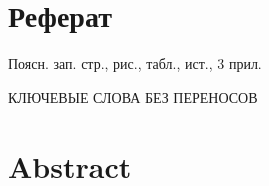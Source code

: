 \documentclass[../main]{subfiles}
\begin{document}
\newpage
{}
\section*{Реферат}
Поясн. зап.  стр.,   рис.,  табл.,  ист., 3 прил.

\begin{jje}
    \MakeUppercase{ключевые слова без переносов}
\end{jje}

\newpage
\section*{Abstract}
\end{document}
